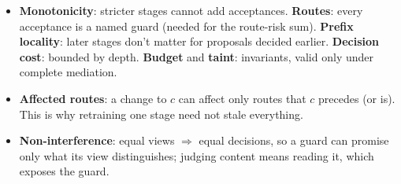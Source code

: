 
\begin{recap}
\begin{itemize}
\item \textbf{Monotonicity}: stricter stages cannot add acceptances. \textbf{Routes}: every acceptance is a named guard (needed for the route-risk sum). \textbf{Prefix locality}: later stages don't matter for proposals decided earlier. \textbf{Decision cost}: bounded by depth. \textbf{Budget} and \textbf{taint}: invariants, valid only under complete mediation.
\item \textbf{Affected routes}: a change to $c$ can affect only routes that $c$ precedes (or is). This is why retraining one stage need not stale everything.
\item \textbf{Non-interference}: equal views $\Rightarrow$ equal decisions, so a guard can promise only what its view distinguishes; judging content means reading it, which exposes the guard.
\end{itemize}
\end{recap}
